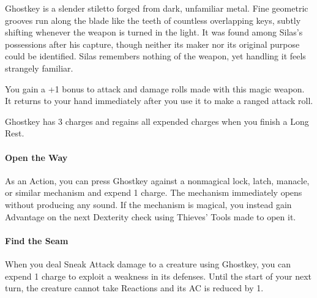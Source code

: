\documentclass[letterpaper,openany,oneside,twocolumn]{book}
\begin{document}
Ghostkey is a slender stiletto forged from dark, unfamiliar metal. Fine geometric grooves run along the blade like the teeth of countless overlapping keys, subtly shifting whenever the weapon is turned in the light. It was found among Silas's possessions after his capture, though neither its maker nor its original purpose could be identified. Silas remembers nothing of the weapon, yet handling it feels strangely familiar.

You gain a +1 bonus to attack and damage rolls made with this magic weapon. It returns to your hand immediately after you use it to make a ranged attack roll.

Ghostkey has 3 charges and regains all expended charges when you finish a Long Rest.\\
\paragraph*{Open the Way} As an Action, you can press Ghostkey against a nonmagical lock, latch, manacle, or similar mechanism and expend 1 charge. The mechanism immediately opens without producing any sound. If the mechanism is magical, you instead gain Advantage on the next Dexterity check using Thieves' Tools made to open it.
\paragraph*{Find the Seam} When you deal Sneak Attack damage to a creature using Ghostkey, you can expend 1 charge to exploit a weakness in its defenses. Until the start of your next turn, the creature cannot take Reactions and its AC is reduced by 1.
\end{document}
